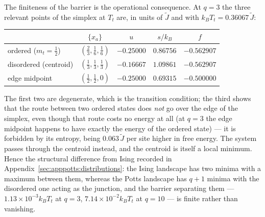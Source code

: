 \documentclass[10pt,a4paper]{article}
\theoremstyle{remark}
\begin{document}
The finiteness of the barrier is the operational consequence. At $q=3$ the three
relevant points of the simplex at $T_t$ are, in units of $\tilde J$ and with
$k_BT_t=0.36067\,\tilde J$:
\begin{center}
\begin{tabular}{lcccc}
\toprule
& $\{x_a\}$ & $u$ & $s/k_B$ & $f$ \\
\midrule
ordered ($m_t=\tfrac12$) & $(\tfrac23,\tfrac16,\tfrac16)$ & $-0.25000$ & $0.86756$ & $-0.562907$ \\
disordered (centroid)    & $(\tfrac13,\tfrac13,\tfrac13)$ & $-0.16667$ & $1.09861$ & $-0.562907$ \\
edge midpoint            & $(\tfrac12,\tfrac12,0)$        & $-0.25000$ & $0.69315$ & $-0.500000$ \\
\bottomrule
\end{tabular}
\end{center}
The first two are degenerate, which is the transition condition; the third shows
that the route between two ordered states does \emph{not} go over the edge of the
simplex, even though that route costs no energy at all (at $q=3$ the edge
midpoint happens to have exactly the energy of the ordered state) --- it is
forbidden by its entropy, being $0.063\,\tilde J$ per site higher in free energy. The system passes
through the centroid instead, and the centroid is itself a local minimum. Hence
the structural difference from Ising recorded in
Appendix~\ref{sec:apppotts:distributions}: the Ising landscape has two minima with
a maximum between them, whereas the Potts landscape has $q+1$ minima with the
disordered one acting as the junction, and the barrier separating them
--- $1.13\times10^{-3}k_BT_t$ at $q=3$, $7.14\times10^{-2}k_BT_t$ at $q=10$ ---
is finite rather than vanishing.
\end{document}
